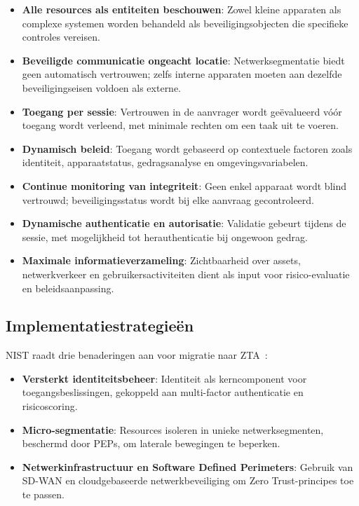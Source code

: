 \begin{itemize}
  \item \textbf{Alle resources als entiteiten beschouwen}: Zowel kleine apparaten als complexe systemen worden behandeld als beveiligingsobjecten die specifieke controles vereisen.  
  \item \textbf{Beveiligde communicatie ongeacht locatie}: Netwerksegmentatie biedt geen automatisch vertrouwen; zelfs interne apparaten moeten aan dezelfde beveiligingseisen voldoen als externe.  
  \item \textbf{Toegang per sessie}: Vertrouwen in de aanvrager wordt geëvalueerd vóór toegang wordt verleend, met minimale rechten om een taak uit te voeren.  
  \item \textbf{Dynamisch beleid}: Toegang wordt gebaseerd op contextuele factoren zoals identiteit, apparaatstatus, gedragsanalyse en omgevingsvariabelen.  
  \item \textbf{Continue monitoring van integriteit}: Geen enkel apparaat wordt blind vertrouwd; beveiligingsstatus wordt bij elke aanvraag gecontroleerd.  
  \item \textbf{Dynamische authenticatie en autorisatie}: Validatie gebeurt tijdens de sessie, met mogelijkheid tot herauthenticatie bij ongewoon gedrag.  
  \item \textbf{Maximale informatieverzameling}: Zichtbaarheid over assets, netwerkverkeer en gebruikersactiviteiten dient als input voor risico-evaluatie en beleidsaanpassing.  
\end{itemize}

\subsection{Implementatiestrategieën}
NIST raadt drie benaderingen aan voor migratie naar ZTA~\autocite{NIST2020}:

\begin{itemize}
  \item \textbf{Versterkt identiteitsbeheer}: Identiteit als kerncomponent voor toegangsbeslissingen, gekoppeld aan multi-factor authenticatie en risicoscoring.  
  \item \textbf{Micro-segmentatie}: Resources isoleren in unieke netwerksegmenten, beschermd door PEPs, om laterale bewegingen te beperken.  
  \item \textbf{Netwerkinfrastructuur en Software Defined Perimeters}: Gebruik van SD-WAN en cloudgebaseerde netwerkbeveiliging om Zero Trust-principes toe te passen.  
\end{itemize}

